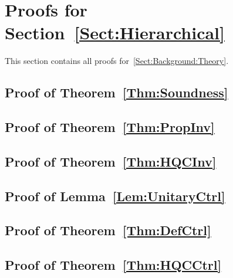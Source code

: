 \section{Proofs for Section~\ref{Sect:Hierarchical}}
%

This section contains all proofs for~\cref{Sect:Background:Theory}.

\subsection{Proof of Theorem~\ref{Thm:Soundness}}
%


\subsection{Proof of Theorem~\ref{Thm:PropInv}}
%


\subsection{Proof of Theorem~\ref{Thm:HQCInv}}
%

\label{App:involution_proofs}

\subsection{Proof of Lemma~\ref{Lem:UnitaryCtrl}}
%


\subsection{Proof of Theorem~\ref{Thm:DefCtrl}}
%


\subsection{Proof of Theorem~\ref{Thm:HQCCtrl}}
%

